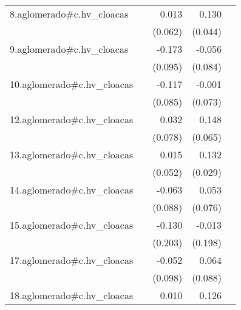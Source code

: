 {\begin{longtable}{l*{4}{D{.}{.}{-1}}}
\addlinespace
8.aglomerado#c.hv\_cloacas&                     &       0.013         &       0.130\sym{**} &                     \\
            &                     &     (0.062)         &     (0.044)         &                     \\
\addlinespace
9.aglomerado#c.hv\_cloacas&                     &      -0.173         &      -0.056         &                     \\
            &                     &     (0.095)         &     (0.084)         &                     \\
\addlinespace
10.aglomerado#c.hv\_cloacas&                     &      -0.117         &      -0.001         &                     \\
            &                     &     (0.085)         &     (0.073)         &                     \\
\addlinespace
12.aglomerado#c.hv\_cloacas&                     &       0.032         &       0.148\sym{*}  &                     \\
            &                     &     (0.078)         &     (0.065)         &                     \\
\addlinespace
13.aglomerado#c.hv\_cloacas&                     &       0.015         &       0.132\sym{***}&                     \\
            &                     &     (0.052)         &     (0.029)         &                     \\
\addlinespace
14.aglomerado#c.hv\_cloacas&                     &      -0.063         &       0.053         &                     \\
            &                     &     (0.088)         &     (0.076)         &                     \\
\addlinespace
15.aglomerado#c.hv\_cloacas&                     &      -0.130         &      -0.013         &                     \\
            &                     &     (0.203)         &     (0.198)         &                     \\
\addlinespace
17.aglomerado#c.hv\_cloacas&                     &      -0.052         &       0.064         &                     \\
            &                     &     (0.098)         &     (0.088)         &                     \\
\addlinespace
18.aglomerado#c.hv\_cloacas&                     &       0.010         &       0.126\sym{**} &                     \\

\end{longtable}}
